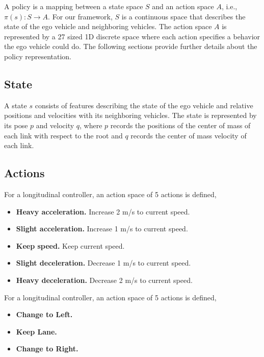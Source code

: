 A policy is a mapping between a state space $S$ and an action space $A$, i.e., $\pi(s) : S \to A$. For our framework, $S$ is a continuous space that describes the state of the ego vehicle and neighboring vehicles. The action space $A$ is represented by a 27 sized 1D discrete space where each action specifies a behavior the ego vehicle could do. The following sections provide further details about the policy representation.

\subsection{State}

A state $s$ consists of features describing the state of the ego vehicle and relative positions and velocities with its neighboring vehicles. The state is represented by its pose $p$ and velocity $q$, where $p$ records the positions of the center of mass of each link with respect to the root and $q$ records the center of mass velocity of each link.

\subsection{Actions}

For a longitudinal controller, an action space of 5 actions is defined,

\begin{itemize}

    \item \textbf{Heavy acceleration.} Increase 2 m/s to current speed.
    
    \item \textbf{Slight acceleration.} Increase 1 m/s to current speed.
    
    \item \textbf{Keep speed.} Keep current speed.
    
    \item \textbf{Slight deceleration.} Decrease 1 m/s to current speed.
    
    \item \textbf{Heavy deceleration.} Decrease 2 m/s to current speed.

\end{itemize}

For a longitudinal controller, an action space of 5 actions is defined,

\begin{itemize}

    \item \textbf{Change to Left.}
    
    \item \textbf{Keep Lane.} 
    
    \item \textbf{Change to Right.} 

\end{itemize}

